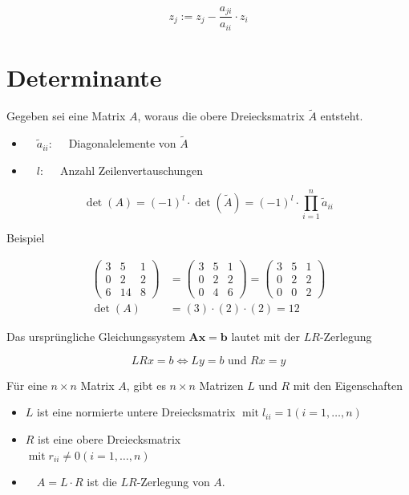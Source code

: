 \documentclass[10pt]{article}
\begin{document}
$$
z_{j}:=z_{j}-\frac{a_{j i}}{a_{i i}} \cdot z_{i}
$$

\section*{Determinante}
Gegeben sei eine Matrix $A$, woraus die obere Dreiecksmatrix $\tilde{A}$ entsteht.

\begin{itemize}
  \item $\quad \tilde{a}_{i i}: \quad$ Diagonalelemente von $\tilde{A}$
  \item $\quad l: \quad$ Anzahl Zeilenvertauschungen
\end{itemize}

$$
\operatorname{det}(A)=(-1)^{l} \cdot \operatorname{det}(\tilde{A})=(-1)^{l} \cdot \prod_{i=1}^{n} \tilde{a}_{i i}
$$

Beispiel

$$
\begin{aligned}
\left(\begin{array}{ccc}
3 & 5 & 1 \\
0 & 2 & 2 \\
6 & 14 & 8
\end{array}\right) & =\left(\begin{array}{lll}
3 & 5 & 1 \\
0 & 2 & 2 \\
0 & 4 & 6
\end{array}\right)=\left(\begin{array}{lll}
3 & 5 & 1 \\
0 & 2 & 2 \\
0 & 0 & 2
\end{array}\right) \\
\operatorname{det}(A) & =(3) \cdot(2) \cdot(2)=12
\end{aligned}
$$

Das ursprüngliche Gleichungssystem $\boldsymbol{A} \boldsymbol{x}=\boldsymbol{b}$ lautet mit der $L R$-Zerlegung

$$
L R x=b \Leftrightarrow L y=b \text { und } R x=y
$$

Für eine $n \times n$ Matrix $A$, gibt es $n \times n$ Matrizen $L$ und $R$ mit den Eigenschaften

\begin{itemize}
  \item $L$ ist eine normierte untere Dreiecksmatrix $\operatorname{mit} l_{i i}=1(i=1, \ldots, n)$
  \item $R$ ist eine obere Dreiecksmatrix\\
$\operatorname{mit} r_{i i} \neq 0(i=1, \ldots, n)$
  \item $\quad A=L \cdot R$ ist die $L R$-Zerlegung von $A$.
\end{itemize}
\end{document}
